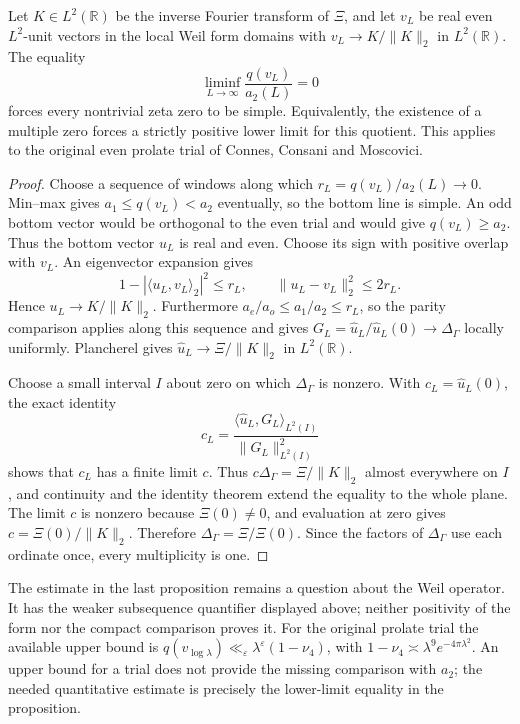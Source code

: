 \begin{proposition}
\label{prop:liminf-rayleigh}
Let $K\in L^2(\mathbb R)$ be the inverse Fourier transform of $\Xi$,
and let $v_L$ be real even $L^2$-unit vectors in the local Weil form
domains with $v_L\to K/\|K\|_2$ in $L^2(\mathbb R)$.
The equality
\begin{equation}
 \liminf_{L\to\infty}\frac{q(v_L)}{a_2(L)}=0
 \label{eq:liminf-rayleigh}
\end{equation}
forces every nontrivial zeta zero to be simple. Equivalently, the
existence of a multiple zero forces a strictly positive lower limit
for this quotient. This applies to the original even prolate trial
of Connes, Consani and Moscovici.
\end{proposition}

\begin{proof}
Choose a sequence of windows along which
$r_L=q(v_L)/a_2(L)\to0$. Min--max gives $a_1\le q(v_L)<a_2$ eventually,
so the bottom line is simple. An odd bottom vector would be orthogonal
to the even trial and would give $q(v_L)\ge a_2$. Thus the bottom vector
$u_L$ is real and even. Choose its sign with positive overlap with $v_L$.
An eigenvector expansion gives
\[
 1-|\langle u_L,v_L\rangle_2|^2\le r_L,
 \qquad \|u_L-v_L\|_2^2\le2r_L.
\]
Hence $u_L\to K/\|K\|_2$. Furthermore
$a_e/a_o\le a_1/a_2\le r_L$, so the parity comparison applies along
this sequence and gives
$G_L=\widehat u_L/\widehat u_L(0)\to\Delta_\Gamma$ locally uniformly.
Plancherel gives $\widehat u_L\to\Xi/\|K\|_2$ in $L^2(\mathbb R)$.

Choose a small interval $I$ about zero on which $\Delta_\Gamma$ is
nonzero. With $c_L=\widehat u_L(0)$, the exact identity
\[
 c_L=\frac{\langle\widehat u_L,G_L\rangle_{L^2(I)}}
                {\|G_L\|_{L^2(I)}^2}
\]
shows that $c_L$ has a finite limit $c$. Thus
$c\Delta_\Gamma=\Xi/\|K\|_2$ almost everywhere on $I$, and continuity
and the identity theorem extend the equality to the whole plane.
The limit $c$ is nonzero because $\Xi(0)\ne0$, and evaluation at zero
gives $c=\Xi(0)/\|K\|_2$. Therefore
$\Delta_\Gamma=\Xi/\Xi(0)$. Since the factors of $\Delta_\Gamma$
use each ordinate once, every multiplicity is one.
\end{proof}

The estimate in the last proposition remains a question about the Weil
operator. It has the weaker subsequence quantifier displayed above;
neither positivity of the form nor the compact comparison proves it.
For the original prolate trial the available upper bound is
$q(v_{\log\lambda})\ll_\varepsilon
\lambda^\varepsilon(1-\nu_4)$, with
$1-\nu_4\asymp\lambda^9e^{-4\pi\lambda^2}$.
An upper bound for a trial does not provide the missing comparison with
$a_2$; the needed quantitative estimate is precisely the lower-limit
equality in the proposition.
